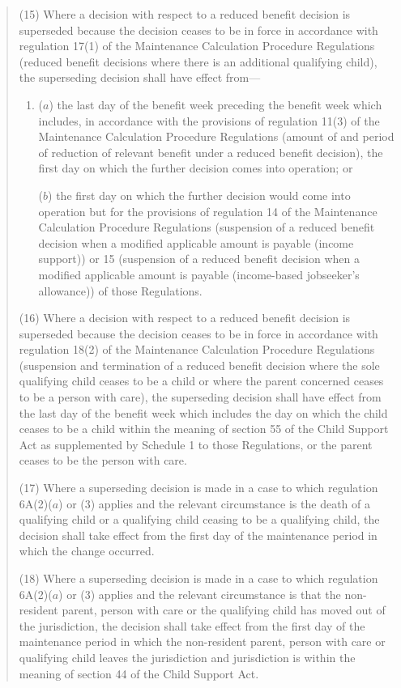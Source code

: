 \documentclass[12pt,a4paper]{article}
\begin{document}
\begin{quotation}
(15) Where a decision with respect to a reduced benefit decision is superseded because the decision ceases to be in force in accordance with regulation 17(1) of the Maintenance Calculation Procedure Regulations (reduced benefit decisions where there is an additional qualifying child), the superseding decision shall have effect from—
\begin{enumerate}\item[]
($a$) the last day of the benefit week preceding the benefit week which includes, in accordance with the provisions of regulation 11(3) of the Maintenance Calculation Procedure Regulations (amount of and period of reduction of relevant benefit under a reduced benefit decision), the first day on which the further decision comes into operation; or

($b$) the first day on which the further decision would come into operation but for the provisions of regulation 14 of the Maintenance Calculation Procedure Regulations (suspension of a reduced benefit decision when a modified applicable amount is payable (income support)) or 15 (suspension of a reduced benefit decision when a modified applicable amount is payable (income-based jobseeker’s allowance)) of those Regulations.
\end{enumerate}

(16) Where a decision with respect to a reduced benefit decision is superseded because the decision ceases to be in force in accordance with regulation 18(2) of the Maintenance Calculation Procedure Regulations (suspension and termination of a reduced benefit decision where the sole qualifying child ceases to be a child or where the parent concerned ceases to be a person with care), the superseding decision shall have effect from the last day of the benefit week which includes the day on which the child ceases to be a child within the meaning of section 55 of the Child Support Act as supplemented by Schedule 1 to those Regulations, or the parent ceases to be the person with care.

(17) Where a superseding decision is made in a case to which regulation 6A(2)($a$)  or (3) applies and the relevant circumstance is the death of a qualifying child or a qualifying child ceasing to be a qualifying child, the decision shall take effect from the first day of the maintenance period in which the change occurred.

(18) Where a superseding decision is made in a case to which regulation 6A(2)($a$)  or (3) applies and the relevant circumstance is that the non-resident parent, person with care or the qualifying child has moved out of the jurisdiction, the decision shall take effect from the first day of the maintenance period in which the non-resident parent, person with care or qualifying child leaves the jurisdiction and jurisdiction is within the meaning of section 44 of the Child Support Act.


\end{quotation}
\end{document}
